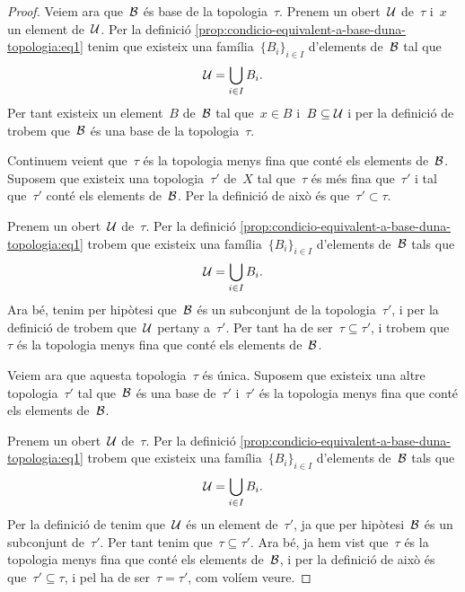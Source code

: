 \documentclass[../topologia.tex]{subfiles}
\begin{document}
\begin{proof}
        Veiem ara que~\(\mathcal{B}\) és base de la topologia~\(\tau\).
        Prenem un obert~\(\mathcal{U}\) de~\(\tau\) i~\(x\) un element de~\(\mathcal{U}\).
        Per la definició \eqref{prop:condicio-equivalent-a-base-duna-topologia:eq1} tenim que existeix una família~\(\{B_{i}\}_{i\in I}\) d'elements de~\(\mathcal{B}\) tal que
        \[
            \mathcal{U}=\bigcup_{i\in I}B_{i}.
        \]
        Per tant existeix un element~\(B\) de~\(\mathcal{B}\) tal que~\(x\in B\) i~\(B\subseteq\mathcal{U}\) i per la definició de  trobem que~\(\mathcal{B}\) és una base de la topologia~\(\tau\).

        Continuem veient que~\(\tau\) és la topologia menys fina que conté els elements de~\(\mathcal{B}\).
        Suposem que existeix una topologia~\(\tau'\) de~\(X\) tal que~\(\tau\) és més fina que~\(\tau'\) i tal que~\(\tau'\) conté els elements de~\(\mathcal{B}\).
        Per la definició de  això és que~\(\tau'\subset\tau\).

        Prenem un obert~\(\mathcal{U}\) de~\(\tau\).
        Per la definició \eqref{prop:condicio-equivalent-a-base-duna-topologia:eq1} trobem que existeix una família~\(\{B_{i}\}_{i\in I}\) d'elements de~\(\mathcal{B}\) tals que
        \[
            \mathcal{U}=\bigcup_{i\in I}B_{i}.
        \]
        Ara bé, tenim per hipòtesi que~\(\mathcal{B}\) és un subconjunt de la topologia~\(\tau'\), i per la definició de  trobem que~\(\mathcal{U}\) pertany a~\(\tau'\).
        Per tant ha de ser~\(\tau\subseteq\tau'\), i trobem que~\(\tau\) és la topologia menys fina que conté els elements de~\(\mathcal{B}\).

        Veiem ara que aquesta topologia~\(\tau\) és única.
        Suposem que existeix una altre topologia~\(\tau'\) tal que~\(\mathcal{B}\) és una base de~\(\tau'\) i~\(\tau'\) és la topologia menys fina que conté els elements de~\(\mathcal{B}\).

        Prenem un obert~\(\mathcal{U}\) de~\(\tau\).
        Per la definició \eqref{prop:condicio-equivalent-a-base-duna-topologia:eq1} trobem que existeix una família~\(\{B_{i}\}_{i\in I}\) d'elements de~\(\mathcal{B}\) tals que
        \[
            \mathcal{U}=\bigcup_{i\in I}B_{i}.
        \]
        Per la definició de  tenim que~\(\mathcal{U}\) és un element de~\(\tau'\), ja que per hipòtesi~\(\mathcal{B}\) és un subconjunt de~\(\tau'\).
        Per tant tenim que~\(\tau\subseteq\tau'\).
        Ara bé, ja hem vist que~\(\tau\) és la topologia menys fina que conté els elements de~\(\mathcal{B}\), i per la definició de  això és que~\(\tau'\subseteq\tau\), i pel  ha de ser~\(\tau=\tau'\), com volíem veure.
    \end{proof}
\end{document}
